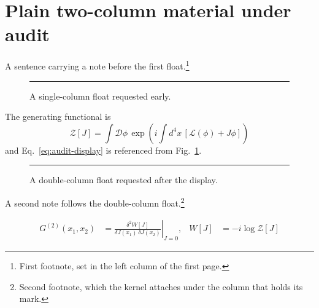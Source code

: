 \documentclass[twocolumn]{article}
\begin{document}
\section{Plain two-column material under audit}
\WBTextA
A sentence carrying a note before the first float.\footnote{First footnote,
set in the left column of the first page.}

\begin{figure}[t]
\centering\rule{.7\columnwidth}{22mm}
\caption{A single-column float requested early.}
\label{fig:audit-column}
\end{figure}

\WBTextB
{}
The generating functional is
\begin{equation}\label{eq:audit-display}
  \mathcal{Z}[J]=\int\mathcal{D}\phi\,
  \exp\!\left(i\int d^4x\,[\mathcal{L}(\phi)+J\phi]\right)
\end{equation}
and Eq.~\ref{eq:audit-display} is referenced from Fig.~\ref{fig:audit-column}.

\begin{figure}[t]
\centering\rule{.7\textwidth}{18mm}
\caption{A double-column float requested after the display.}
\label{fig:audit-double}
\end{figure}

\WBTextC
A second note follows the double-column float.\footnote{Second footnote,
which the kernel attaches under the column that holds its mark.}
\WBTextD

\begin{align}
  G^{(2)}(x_1,x_2) &= \left.\frac{\delta^2 W[J]}
     {\delta J(x_1)\,\delta J(x_2)}\right|_{J=0}, &
  W[J] &= -i\log\mathcal{Z}[J]
\end{align}

\WBTextE
{}
\WBTextF\WBTextG\WBTextH
\end{document}
